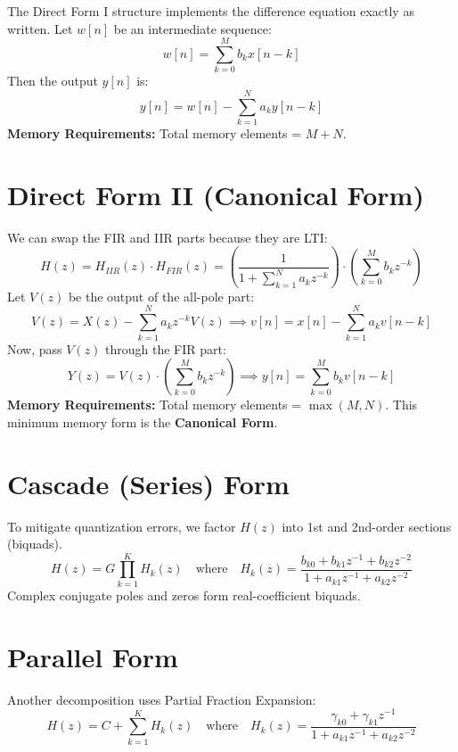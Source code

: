 \documentclass[11pt,a4paper]{article}
\begin{document}
The Direct Form I structure implements the difference equation exactly as written. 
Let $w[n]$ be an intermediate sequence:
\begin{equation}
w[n] = \sum_{k=0}^{M} b_k x[n-k]
\end{equation}
Then the output $y[n]$ is:
\begin{equation}
y[n] = w[n] - \sum_{k=1}^{N} a_k y[n-k]
\end{equation}
\textbf{Memory Requirements:} Total memory elements = $M + N$. 

\section{Direct Form II (Canonical Form)}
We can swap the FIR and IIR parts because they are LTI:
\begin{equation}
H(z) = H_{IIR}(z) \cdot H_{FIR}(z) = \left( \frac{1}{1 + \sum_{k=1}^{N} a_k z^{-k}} \right) \cdot \left( \sum_{k=0}^{M} b_k z^{-k} \right)
\end{equation}
Let $V(z)$ be the output of the all-pole part:
\begin{equation}
V(z) = X(z) - \sum_{k=1}^{N} a_k z^{-k} V(z) \implies v[n] = x[n] - \sum_{k=1}^{N} a_k v[n-k]
\end{equation}
Now, pass $V(z)$ through the FIR part:
\begin{equation}
Y(z) = V(z) \cdot \left( \sum_{k=0}^{M} b_k z^{-k} \right) \implies y[n] = \sum_{k=0}^{M} b_k v[n-k]
\end{equation}
\textbf{Memory Requirements:} Total memory elements = $\max(M, N)$. This minimum memory form is the \textbf{Canonical Form}.

\section{Cascade (Series) Form}
To mitigate quantization errors, we factor $H(z)$ into 1st and 2nd-order sections (biquads).
\begin{equation}
H(z) = G \prod_{k=1}^{K} H_k(z) \quad \text{where} \quad H_k(z) = \frac{b_{k0} + b_{k1} z^{-1} + b_{k2} z^{-2}}{1 + a_{k1} z^{-1} + a_{k2} z^{-2}}
\end{equation}
Complex conjugate poles and zeros form real-coefficient biquads.

\section{Parallel Form}
Another decomposition uses Partial Fraction Expansion:
\begin{equation}
H(z) = C + \sum_{k=1}^{K} H_k(z) \quad \text{where} \quad H_k(z) = \frac{\gamma_{k0} + \gamma_{k1} z^{-1}}{1 + a_{k1} z^{-1} + a_{k2} z^{-2}}
\end{equation}
\end{document}
